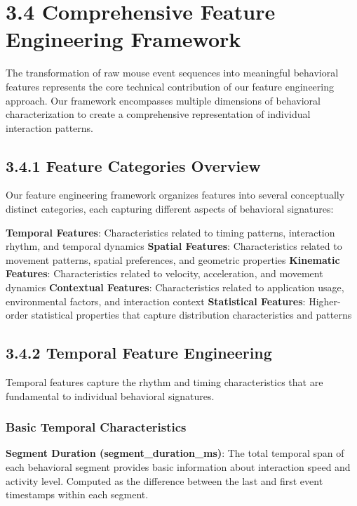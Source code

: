 \documentclass[
  12pt,
  a4paper,
]{report}
\begin{document}
\section{3.4 Comprehensive Feature Engineering
Framework}\label{comprehensive-feature-engineering-framework}

The transformation of raw mouse event sequences into meaningful
behavioral features represents the core technical contribution of our
feature engineering approach. Our framework encompasses multiple
dimensions of behavioral characterization to create a comprehensive
representation of individual interaction patterns.

\subsection{3.4.1 Feature Categories
Overview}\label{feature-categories-overview}

Our feature engineering framework organizes features into several
conceptually distinct categories, each capturing different aspects of
behavioral signatures:

\textbf{Temporal Features}: Characteristics related to timing patterns,
interaction rhythm, and temporal dynamics \textbf{Spatial Features}:
Characteristics related to movement patterns, spatial preferences, and
geometric properties \textbf{Kinematic Features}: Characteristics
related to velocity, acceleration, and movement dynamics
\textbf{Contextual Features}: Characteristics related to application
usage, environmental factors, and interaction context
\textbf{Statistical Features}: Higher-order statistical properties that
capture distribution characteristics and patterns

\subsection{3.4.2 Temporal Feature
Engineering}\label{temporal-feature-engineering}

Temporal features capture the rhythm and timing characteristics that are
fundamental to individual behavioral signatures.

\subsubsection{Basic Temporal
Characteristics}\label{basic-temporal-characteristics}

\textbf{Segment Duration (segment\_duration\_ms)}: The total temporal
span of each behavioral segment provides basic information about
interaction speed and activity level. Computed as the difference between
the last and first event timestamps within each segment.
\end{document}

